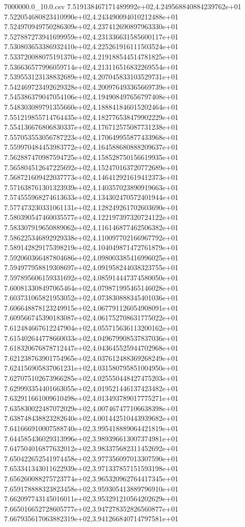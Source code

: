 \begin{filecontents*}{7000000.0_10.0.csv}
7.519138467171489992e+02,4.249568840884239762e+01
7.522054680823410990e+02,4.243490094010212488e+01
7.524970949750286309e+02,4.237412690897963330e+01
7.527887273941699959e+02,4.231336631585600117e+01
7.530803653386932410e+02,4.225261916111503524e+01
7.533720088075191370e+02,4.219188544514781825e+01
7.536636577996059714e+02,4.213116516832269554e+01
7.539553123138832689e+02,4.207045833103529731e+01
7.542469723492629328e+02,4.200976493365669739e+01
7.545386379047054106e+02,4.194908497656797408e+01
7.548303089791355660e+02,4.188841846015202464e+01
7.551219855714764435e+02,4.182776538479902229e+01
7.554136676806830337e+02,4.176712575087731238e+01
7.557053553056787223e+02,4.170649955877433968e+01
7.559970484453983772e+02,4.164588680888209637e+01
7.562887470987594725e+02,4.158528750156619935e+01
7.565804512647225692e+02,4.152470163720772689e+01
7.568721609422037773e+02,4.146412921619412373e+01
7.571638761301323939e+02,4.140357023890919663e+01
7.574555968274613633e+02,4.134302470572401944e+01
7.577473230331061131e+02,4.128249261702603690e+01
7.580390547460035577e+02,4.122197397320724122e+01
7.583307919650889062e+02,4.116146877462506382e+01
7.586225346892929338e+02,4.110097702166967792e+01
7.589142829175398219e+02,4.104049871472761879e+01
7.592060366487804686e+02,4.098003385416996025e+01
7.594977958819308697e+02,4.091958244038323755e+01
7.597895606159331692e+02,4.085914447374580050e+01
7.600813308497065464e+02,4.079871995465146028e+01
7.603731065821953052e+02,4.073830888345401036e+01
7.606648878123249915e+02,4.067791126054908091e+01
7.609566745390183087e+02,4.061752708631775022e+01
7.612484667612247904e+02,4.055715636113200162e+01
7.615402644778660033e+02,4.049679908537837036e+01
7.618320676878712447e+02,4.043645525944702968e+01
7.621238763901754965e+02,4.037612488369268249e+01
7.624156905837061231e+02,4.031580795851004950e+01
7.627075102673966285e+02,4.025550448427475203e+01
7.629993354401663055e+02,4.019521446137423482e+01
7.632911661009610498e+02,4.013493789017775271e+01
7.635830022487072029e+02,4.007467477106638398e+01
7.638748438823282640e+02,4.001442510443939682e+01
7.641666910007588740e+02,3.995418889064421819e+01
7.644585436029313996e+02,3.989396613007374981e+01
7.647504016877632012e+02,3.983375682311452692e+01
7.650422652541974458e+02,3.977356097013307590e+01
7.653341343011622939e+02,3.971337857151593198e+01
7.656260088275723774e+02,3.965320962764417345e+01
7.659178888323823458e+02,3.959305413889796910e+01
7.662097743145016011e+02,3.953291210564202629e+01
7.665016652728605777e+02,3.947278352826560877e+01
7.667935617063882319e+02,3.941266840714797581e+01

\end{filecontents*}
